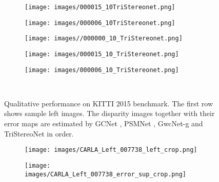 \documentclass[10pt,twocolumn,letterpaper]{article}
\begin{document}
\begin{figure*}[htpb]
\begin{center}
\begin{minipage}[c]{0.985\textwidth}
			\hspace{-0.5\baselineskip}
			\hfill
			\begin{subfigure}[c]{0.33\linewidth}
				\texttt{[image: images/000015\_10TriStereonet.png]}
			\end{subfigure}
			\hspace{-0.5\baselineskip}
			\hfill
			\begin{subfigure}[c]{0.33\linewidth}
				\texttt{[image: images/000006\_10TriStereonet.png]}
			\end{subfigure}
			\begin{subfigure}[c]{0.33\linewidth}
				\texttt{[image: images//000000\_10\_TriStereonet.png]}
			\end{subfigure}
			\hspace{-0.5\baselineskip}
			\hfill
			\begin{subfigure}[c]{0.33\linewidth}
				\texttt{[image: images/000015\_10\_TriStereonet.png]}
			\end{subfigure}
			\hspace{-0.5\baselineskip}
			\hfill
			\begin{subfigure}[c]{0.33\linewidth}
				\texttt{[image: images/000006\_10\_TriStereonet.png]}
			\end{subfigure}
		\end{minipage}
		\\
\vspace{-0.3cm}
		\caption{Qualitative performance on KITTI 2015 benchmark. The first row shows sample left images. The disparity images together with their error maps are estimated by GCNet \cite{kendall2017end}, PSMNet \cite{chang2018pyramid}, GwcNet-g \cite{guo2019group} and TriStereoNet in order.}
		\label{fig:KittiBenchmark}
	\end{center}
\end{figure*} \begin{figure}[tbp]
	\captionsetup[subfigure]{labelformat=empty}
	\centering
	\begin{subfigure}[c]{.242\linewidth}
		\texttt{[image: images/CARLA\_Left\_007738\_left\_crop.png]}
		\vspace*{-0.38cm}
	\end{subfigure}
	\begin{subfigure}[c]{.242\linewidth}
		\texttt{[image: images/CARLA\_Left\_007738\_error\_sup\_crop.png]}
		\vspace*{-0.38cm}
	\end{subfigure}

\end{figure}
\end{document}
